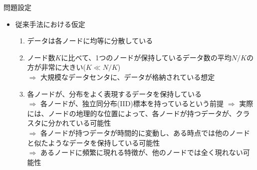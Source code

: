 \documentclass[dvipdfmx,notheorems,t]{beamer}
\begin{document}
\begin{frame}{問題設定}

\begin{itemize}
	\item 従来手法における仮定
	\begin{enumerate}
		\item データは各ノードに均等に分散している
		\newline
		
		\item ノード数$K$に比べて、1つのノードが保持しているデータ数の平均$N / K$の方が非常に大きい($K \ll N / K$) \\
		$\Rightarrow$ 大規模なデータセンタに、データが格納されている想定
		\newline
		
		\item 各ノードが、分布をよく表現するデータを保持している \\
		$\Rightarrow$ 各ノードが、\alert{独立同分布}(IID)標本を持っているという前提 \newline \newline
		$\Rightarrow$ 実際には、ノードの地理的な位置によって、各ノードが持つデータが、クラスタに分かれている可能性 \\
		$\Rightarrow$ 各ノードが持つデータが時間的に変動し、ある時点では他のノードと似たようなデータを保持している可能性 \\
		$\Rightarrow$ あるノードに頻繁に現れる特徴が、他のノードでは全く現れない可能性
	\end{enumerate}
\end{itemize}

\end{frame}
\end{document}
